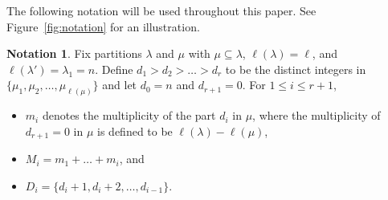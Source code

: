 \documentclass{amsart}
\numberwithin{equation}{section}
\theoremstyle{definition}
\newtheorem{notation}[thm]{Notation}
\begin{document}
The following notation will be used throughout this paper. See
Figure~\ref{fig:notation} for an illustration.

\begin{notation}\label{notation}
  Fix partitions $\lambda$ and $\mu$ with $\mu\subseteq\lambda$,
  $\ell(\lambda)=\ell$, and $\ell(\lambda')=\lambda_1=n$. Define
  $d_1>d_2>\dots>d_r$ to be the distinct integers in
  $\{\mu_1,\mu_2,\dots,\mu_{\ell(\mu)}\}$ and let $d_0=n$ and $d_{r+1}=0$. For
  $1\le i\le r+1$, 
  \begin{itemize}
  \item $m_i$ denotes the multiplicity of the part $d_i$ in $\mu$, where the
    multiplicity of $d_{r+1}=0$ in $\mu$ is defined to be
    $\ell(\lambda)-\ell(\mu)$,
  \item $M_i=m_1+\dots+m_i$, and 
  \item $D_i=\{d_{i}+1,d_{i}+2,\dots,d_{i-1}\}$.
  \end{itemize}
\end{notation}
\end{document}

